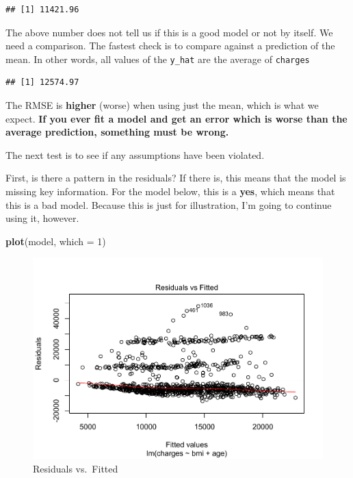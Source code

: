 \documentclass[openany]{book}
\newenvironment{Shaded}{\begin{snugshade}}{\end{snugshade}}
\newcommand{\DataTypeTok}[1]{\textcolor[rgb]{0.13,0.29,0.53}{#1}}
\newcommand{\DecValTok}[1]{\textcolor[rgb]{0.00,0.00,0.81}{#1}}
\newcommand{\KeywordTok}[1]{\textcolor[rgb]{0.13,0.29,0.53}{\textbf{#1}}}
\newcommand{\NormalTok}[1]{#1}
\newcommand{\OperatorTok}[1]{\textcolor[rgb]{0.81,0.36,0.00}{\textbf{#1}}}
\begin{document}
\begin{verbatim}
## [1] 11421.96
\end{verbatim}

The above number does not tell us if this is a good model or not by itself. We need a comparison. The fastest check is to compare against a prediction of the mean. In other words, all values of the \texttt{y\_hat} are the average of \texttt{charges}

\begin{Shaded}
\end{Shaded}

\begin{verbatim}
## [1] 12574.97
\end{verbatim}

The RMSE is \textbf{higher} (worse) when using just the mean, which is what we expect. \textbf{If you ever fit a model and get an error which is worse than the average prediction, something must be wrong.}

The next test is to see if any assumptions have been violated.

First, is there a pattern in the residuals? If there is, this means that the model is missing key information. For the model below, this is a \textbf{yes}, which means that this is a bad model. Because this is just for illustration, I'm going to continue using it, however.

\begin{Shaded}
\begin{Highlighting}[]
\KeywordTok{plot}\NormalTok{(model, }\DataTypeTok{which =} \DecValTok{1}\NormalTok{)}
\end{Highlighting}
\end{Shaded}

\begin{figure}
\centering
\includegraphics{05-linear-models_files/figure-latex/unnamed-chunk-9-1.pdf}
\caption{\label{fig:unnamed-chunk-9}Residuals vs.~Fitted}
\end{figure}
\end{document}
